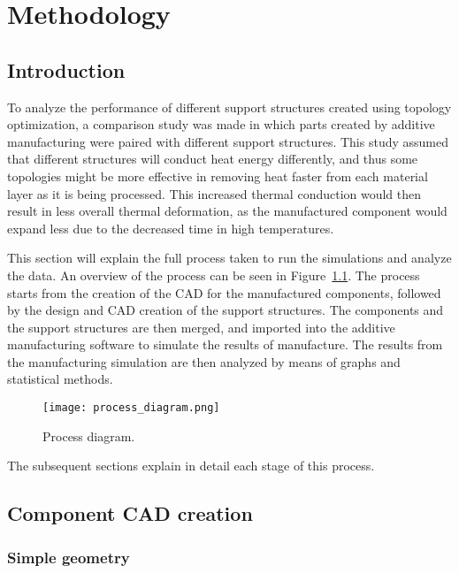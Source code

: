 \documentclass[../main.tex]{subfiles}
\begin{document}
	
\chapter{Methodology}
\section{Introduction}

To analyze the performance of different support structures created using topology optimization, a comparison study was made in which parts created by additive manufacturing were paired with different support structures. This study assumed that different structures will conduct heat energy differently, and thus some topologies might be more effective in removing heat faster from each material layer as it is being processed. This increased thermal conduction would then result in less overall thermal deformation, as the manufactured component would expand less due to the decreased time in high temperatures. 

This section will explain the full process taken to run the simulations and analyze the data. An overview of the process can be seen in Figure~\ref{fig:process_diagram}. The process starts from the creation of the CAD for the manufactured components, followed by the design and CAD creation of the support structures. The components and the support structures are then merged, and imported into the additive manufacturing software to simulate the results of manufacture. The results from the manufacturing simulation are then analyzed by means of graphs and statistical methods. 

\begin{figure}
  \begin{center}
    \texttt{[image: process\_diagram.png]}
  \end{center}
  \caption{Process diagram.}\label{fig:process_diagram}
\end{figure}

The subsequent sections explain in detail each stage of this process.

\section{Component CAD creation}

\subsection{Simple geometry}
\end{document}
